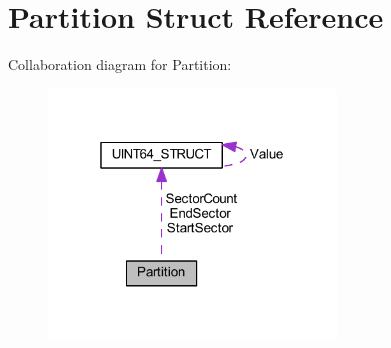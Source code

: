 \hypertarget{struct_partition}{}\section{Partition Struct Reference}
\label{struct_partition}


Collaboration diagram for Partition\+:
\nopagebreak
\begin{figure}[H]
\begin{center}
\leavevmode
\includegraphics[width=217pt]{struct_partition__coll__graph}
\end{center}
\end{figure}
